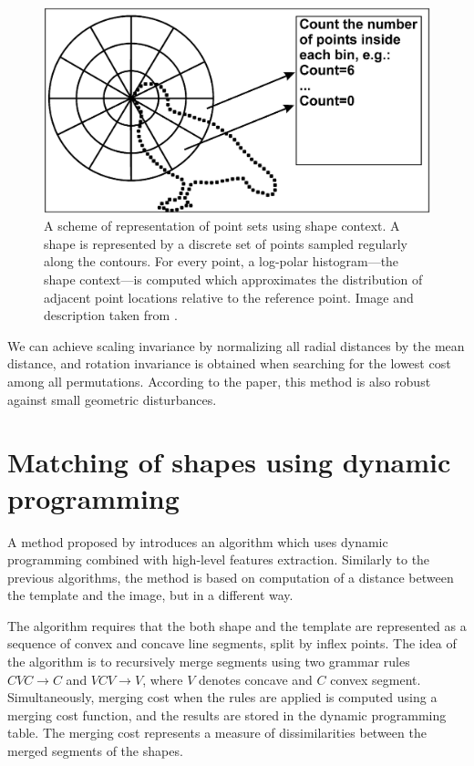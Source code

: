 \begin{figure}
\centering
\includegraphics[width=\linewidth]{ext/polarbins.png}
\caption{A scheme of representation of point sets using shape context.
A shape is represented by a discrete set of points sampled regularly along
the contours. For every point, a log-polar histogram—the shape context—is
computed which approximates the distribution of adjacent point locations
relative to the reference point. Image and description taken from \citet{simple}.}
\label{fig:polarbins}
\end{figure}

We can achieve scaling invariance by normalizing all radial distances by the mean distance, and rotation invariance is obtained when searching for the lowest cost among all permutations. According to the paper, this method is also robust against small geometric disturbances.

\section{Matching of shapes using dynamic programming}

A method proposed by \citet{convex} introduces an algorithm which uses dynamic programming combined with high-level features extraction. Similarly to the previous algorithms, the method is based on computation of a distance between the template and the image, but in a different way.

The algorithm requires that the both shape and the template are represented as a sequence of convex and concave line segments, split by inflex points. The idea of the algorithm is to recursively merge segments using two grammar rules $CVC \to C$ and $VCV \to V$, where $V$ denotes concave and $C$ convex segment. Simultaneously, merging cost when the rules are applied is computed using a merging cost function, and the results are stored in the dynamic programming table. The merging cost represents a measure of dissimilarities between the merged segments of the shapes.

